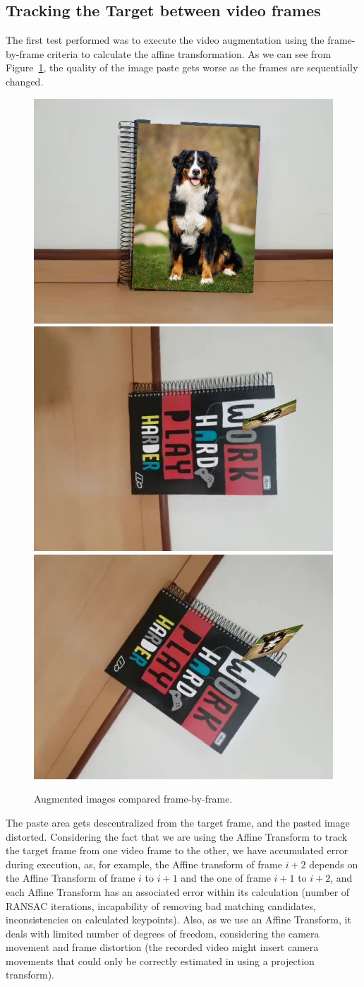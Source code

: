 \documentclass[]{IEEEtran}
\begin{document}
\subsection{Tracking the Target between video frames}

The first test performed was to execute the video augmentation using the frame-by-frame criteria to calculate the affine transformation. As we can see from Figure~\ref{fig:frame-by-frame}, the quality of the image paste gets worse as the frames are sequentially changed.

\begin{figure}[H]
  \centering
  \includegraphics[width=0.31\hsize]{img/frame-by-frame_0.jpg}
  \includegraphics[width=0.31\hsize]{img/frame-by-frame_1.jpg}
  \includegraphics[width=0.31\hsize]{img/frame-by-frame_2.jpg}
  \caption{Augmented images compared frame-by-frame.}
  \label{fig:frame-by-frame}
\end{figure}

 The paste area gets descentralized from the target frame, and the pasted image distorted.
Considering the fact that we are using the Affine Transform to track the target frame from one video frame to the other, we have accumulated error during execution, as, for example, the Affine transform of frame $i + 2$ depends on the Affine Transform of frame $i$ to $i + 1$ and the one of frame $i + 1$ to $i + 2$, and each Affine Transform has an associated error within its calculation (number of RANSAC iterations, incapability of removing bad matching candidates, inconsistencies on calculated keypoints). Also, as we use an Affine Transform, it deals with limited number of degrees of freedom, considering the camera movement and frame distortion (the recorded video might insert camera movements that could only be correctly estimated in using a projection transform).
\end{document}
